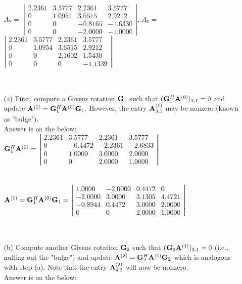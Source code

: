 \documentclass[english,onecolumn]{IEEEtran}
\newcommand{\bA}{{\bf A}}
\newcommand{\bG}{{\bf G}}
\begin{document}
\begin{enumerate}
    $A_2=$
    $\left|\begin{array}{rrrr}2.2361 & 3.5777 & 2.2361 & 3.5777 \\ 0 & 1.0954 & 3.6515 & 2.9212 \\ 0 & 0 & -0.8165 & -1.6330 \\ 0 & 0 & -2.0000 & -1.0000\end{array}\right|$,    
    $A_3=$
    $\left|\begin{array}{rrrr}2.2361 & 3.5777 & 2.2361 & 3.5777 \\ 0 & 1.0954 & 3.6515 & 2.9212 \\ 0 & 0 & 2.1602 & 1.5430 \\ 0 & 0 & 0 & -1.1339\end{array}\right|$\\\\\\
    
    \item[(a)] First, compute a Givens rotation $\bG_1$ such that $(\bG_1^{H}\bA^{(0)})_{2,1} =0$ and update $\bA^{(1)}  = \bG_1^{H} \bA^{(0)} \bG_1$. However, the entry $\bA^{(1)}_{3,1}$ may be nonzero (known as "bulge").\\
    Answer is on the below:\\
    $\bG_1^{H}\bA^{(0)}=$
    $\left|\begin{array}{rrrr}2.2361 & 3.5777 & 2.2361 & 3.5777 \\ 0 & -0.4472 & -2.2361 & -2.6833 \\ 0 & 1.0000 & 3.0000 & 2.0000 \\ 0 & 0 & 2.0000 & 1.0000\end{array}\right|$\\\\\\
    
    $\bA^{(1)}  = \bG_1^{H} \bA^{(0)} \bG_1=$
    $\left|\begin{array}{rrrr}1.0000 & -2.0000 & 0.4472 & 0\\ -2.0000 & 3.0000 & 3.1305 & 4.4721 \\ -0.8944 & 0.4472 & 3.0000 & 2.0000 \\ 0 & 0 & 2.0000 & 1.0000\end{array}\right|$\\\\\\
    
    
    
    \item[(b)] Compute another Givens rotation $\bG_2$ such that $(\bG_2\bA^{(1)})_{3,1} =0 $ (i.e., nulling out the "bulge") and update $\bA^{(2)}  = \bG_2^{H} \bA^{(1)} \bG_2$ which is analogous with step (a). Note that the entry $\bA^{(2)}_{4,2}$ will now be nonzero.\\
    Answer is on the below:\\
    

\end{enumerate}
\end{document}
